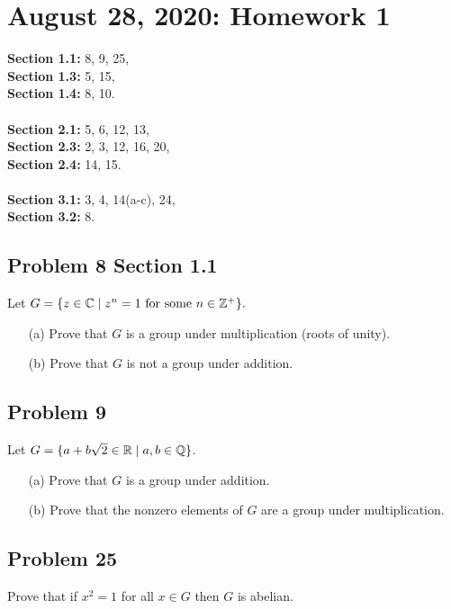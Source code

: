 \section{August 28, 2020: Homework 1}
\textbf{Section 1.1:} 8, 9, 25, \\
\textbf{Section 1.3:} 5, 15, \\
\textbf{Section 1.4:} 8, 10. \\
\\
\textbf{Section 2.1:} 5, 6, 12, 13, \\
\textbf{Section 2.3:} 2, 3, 12, 16, 20, \\
\textbf{Section 2.4:} 14, 15.\\
\\
\textbf{Section 3.1:} 3, 4, 14(a-c), 24, \\
\textbf{Section 3.2:} 8. 
\subsection{Problem 8 Section 1.1}
\begin{prob}
    Let $G=\{z\in \mathbb{C} \mid z^{n}=1\ \text{for some} \ n \in \mathbb{Z}^{+}\}.$
   \begin{enumerate}
       \item[(a)] Prove that $G$ is a group under multiplication (roots of unity).
       \item[(b)] Prove that $G$ is not a group under addition.
   \end{enumerate} 
\end{prob}

\subsection{Problem 9}
\begin{prob}
    Let $G=\{a+b\sqrt{2} \in \mathbb{R} \mid a,b\in \mathbb{Q}\} $.
    \begin{enumerate}
       \item[(a)] Prove that $G$ is a group under addition.
       \item[(b)] Prove that the nonzero elements of $G$ are a group under multiplication.
    \end{enumerate}
\end{prob}

\subsection{Problem 25}
\begin{prob}
    Prove that if $x^2=1$ for all $x\in G$ then $G$ is abelian.
\end{prob}

